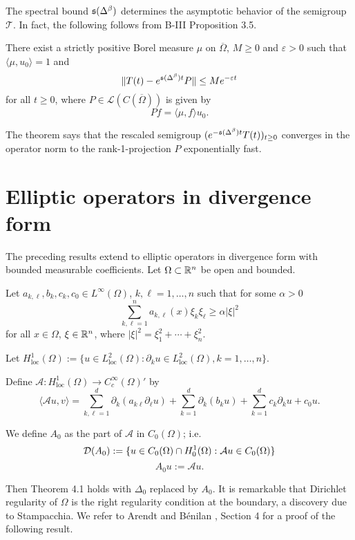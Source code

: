 The spectral bound $\mathfrak{s}(\Delta^\beta)$ determines the asymptotic behavior of the semigroup $\mathcal{T}$. In fact, the following follows from B-III Proposition 3.5.

\begin{corollary}[4.4]
There exist a strictly positive Borel measure $\mu$ on $\overline{\Omega}$, $M \geq 0$ and $\varepsilon > 0$ such that $\langle \mu, u_0 \rangle = 1$ and
\[\|T(t) - e^{\mathfrak{s}(\Delta^\beta)t}P\| \leq Me^{-\varepsilon t}\]
for all $t \geq 0$, where $P \in \mathcal{L}(C(\overline{\Omega}))$ is given by
\[Pf = \langle \mu, f \rangle u_0.\]
\end{corollary}

The theorem says that the rescaled semigroup $(e^{-\mathfrak{s}(\Delta^\beta)t}T(t))_{t \geq 0}$ converges in the operator norm to the rank-1-projection $P$ exponentially fast.

\section{Elliptic operators in divergence form}

The preceding results extend to elliptic operators in divergence form with bounded measurable coefficients. Let $\Omega \subset \mathbb{R}^n$ be open and bounded.

Let $a_{k,\ell}, b_k, c_k, c_0 \in L^\infty(\Omega)$, $k, \ell = 1, \ldots, n$ such that for some $\alpha > 0$
\[\sum_{k,\ell=1}^n a_{k,\ell}(x)\xi_k\xi_\ell \geq \alpha|\xi|^2\]
for all $x \in \Omega$, $\xi \in \mathbb{R}^n$, where $|\xi|^2 = \xi_1^2 + \cdots + \xi_n^2$.

Let $H^1_{\text{loc}}(\Omega) := \{u \in L^2_{\text{loc}}(\Omega) : \partial_k u \in L^2_{\text{loc}}(\Omega), k = 1, \ldots, n\}$.

Define $\mathcal{A} : H^1_{\text{loc}}(\Omega) \to C_c^\infty(\Omega)'$ by
\[\langle \mathcal{A}u, v \rangle = \sum_{k,\ell=1}^d \partial_k(a_{k\ell}\partial_\ell u) + \sum_{k=1}^d \partial_k(b_k u) + \sum_{k=1}^d c_k \partial_k u + c_0 u.\]

We define $A_0$ as the part of $\mathcal{A}$ in $C_0(\Omega)$; i.e.
\[\mathcal{D}(A_0) := \{u \in C_0(\Omega) \cap H^1_0(\Omega) : \mathcal{A}u \in C_0(\Omega)\}\]
\[A_0 u := \mathcal{A}u.\]

Then Theorem 4.1 holds with $\Delta_0$ replaced by $A_0$. It is remarkable that Dirichlet regularity of $\Omega$ is the right regularity condition at the boundary, a discovery due to Stampacchia. We refer to Arendt and Bénilan \cite{ArBe99}, Section 4 for a proof of the following result.

